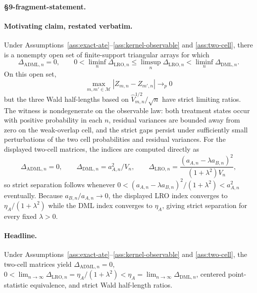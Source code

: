\paragraph{\S9-fragment-statement.}
\begin{theorem}\label{thm:two-cell-witness}
\paragraph{Motivating claim, restated verbatim.}
Under Assumptions~\ref{ass:exact-ate}--\ref{ass:kernel-observable} and \ref{ass:two-cell}, there is a nonempty open set of finite-support triangular arrays for which
\[
  \Delta_{\mathrm{ADML},n}=0,\qquad
  0<\liminf_n\Delta_{\mathrm{LRO},n}
  \le \limsup_n\Delta_{\mathrm{LRO},n}
  < \liminf_n\Delta_{\mathrm{DML},n}.
\]
On this open set,
\[
  \max_{m,m'\in\mathcal M}|Z_{m,n}-Z_{m',n}|\to_p0
\]
but the three Wald half-lengths based on \(\hat V_{m,n}^{1/2}/\sqrt n\) have strict limiting ratios.  The witness is nondegenerate on the observable law: both treatment states occur with positive probability in each \(n\), residual variances are bounded away from zero on the weak-overlap cell, and the strict gaps persist under sufficiently small perturbations of the two cell probabilities and residual variances.  For the displayed two-cell matrices, the indices are computed directly as
\[
  \Delta_{\mathrm{ADML},n}=0,\qquad
  \Delta_{\mathrm{DML},n}=a_{A,n}^2/V_n,\qquad
  \Delta_{\mathrm{LRO},n}
  =
  \frac{(a_{A,n}-\lambda a_{B,n})^2}{(1+\lambda^2)V_n},
\]
so strict separation follows whenever \(0< (a_{A,n}-\lambda a_{B,n})^2/(1+\lambda^2)<a_{A,n}^2\) eventually.
Because \(a_{B,n}/a_{A,n}\to0\), the displayed LRO index converges to \(\eta_A/(1+\lambda^2)\) while the DML index converges to \(\eta_A\), giving strict separation for every fixed \(\lambda>0\).

\paragraph{Headline.}
Under Assumptions~\ref{ass:exact-ate}--\ref{ass:kernel-observable} and \ref{ass:two-cell}, the two-cell matrices yield \(\Delta_{\mathrm{ADML},n}=0\), \(0<\lim_{n\to\infty}\Delta_{\mathrm{LRO},n}=\eta_A/(1+\lambda^2)<\eta_A=\lim_{n\to\infty}\Delta_{\mathrm{DML},n}\), centered point-statistic equivalence, and strict Wald half-length ratios.
\end{theorem}

